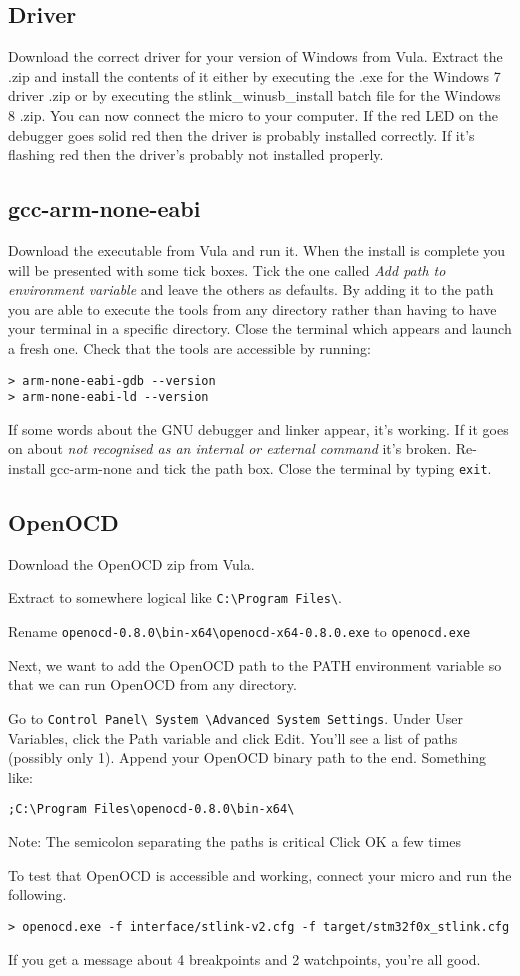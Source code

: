 \subsection{Driver}
Download the correct driver for your version of Windows from Vula. Extract the .zip and install the contents of it either by executing the .exe for the Windows 7 driver .zip or by executing the stlink\_winusb\_install batch file for the Windows 8 .zip.
You can now connect the micro to your computer. If the red LED on the debugger goes solid red then the driver is probably installed correctly. If it's flashing red then the driver's probably not installed properly. 

\subsection{gcc-arm-none-eabi}
Download the executable from Vula and run it. When the install is complete you will be presented with some tick boxes. Tick the one called \textit{Add path to environment variable} and leave the others as defaults. By adding it to the path you are able to execute the tools from any directory rather than having to have your terminal in a specific directory. 
Close the terminal which appears and launch a fresh one. Check that the tools are accessible by running:
\begin{lstlisting}[style=BashStyle]
> arm-none-eabi-gdb --version
> arm-none-eabi-ld --version
\end{lstlisting}
If some words about the GNU debugger and linker appear, it's working. 
If it goes on about \textit{not recognised as an internal or external command} it's broken. Re-install gcc-arm-none and tick the path box.
Close the terminal by typing \texttt{exit}.


\subsection{OpenOCD}
Download the OpenOCD zip from Vula. 

Extract to somewhere logical like \verb+C:\Program Files\+. 

Rename \verb+openocd-0.8.0\bin-x64\openocd-x64-0.8.0.exe+ to \verb+openocd.exe+

Next, we want to add the OpenOCD path to the PATH environment variable so that we can run OpenOCD from any directory.

Go to \verb+Control Panel\ System \Advanced System Settings+. Under User Variables, click the Path variable and click Edit. You’ll see a list of paths (possibly only 1). Append your OpenOCD binary path to the end.
Something like:
\begin{verbatim}
;C:\Program Files\openocd-0.8.0\bin-x64\
\end{verbatim}
Note: The semicolon separating the paths is critical Click OK a few times 

To test that OpenOCD is accessible and working, connect your micro and run the following.
\begin{lstlisting}[style=BashStyle]
> openocd.exe -f interface/stlink-v2.cfg -f target/stm32f0x_stlink.cfg
\end{lstlisting}
If you get a message about 4 breakpoints and 2 watchpoints, you're all good.

